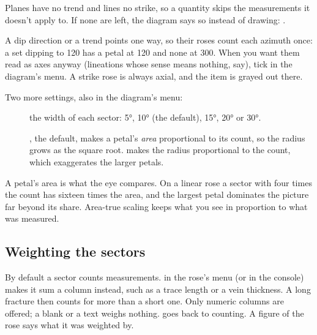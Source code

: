 
Planes have no trend and lines no strike, so a quantity skips the measurements it doesn't apply to. If
none are left, the diagram says so instead of drawing: .

A dip direction or a trend points one way, so their roses count each azimuth once: a set dipping to 120
has a petal at 120 and none at 300. When you want them read as axes anyway (lineations whose sense means
nothing, say), tick  in the diagram's menu. A strike rose is always axial,
and the item is grayed out there.

Two more settings, also in the diagram's menu:

\begin{description}
\item[] the width of each sector: 5°, 10° (the default), 15°, 20° or 30°.
\item[] , the default, makes a petal's \emph{area} proportional to its count,
so the radius grows as the square root.  makes the radius proportional to the count, which
exaggerates the larger petals.
\end{description}

\begin{why}
A petal's area is what the eye compares. On a linear rose a sector with four times the count has sixteen
times the area, and the largest petal dominates the picture far beyond its share. Area-true scaling keeps
what you see in proportion to what was measured.
\end{why}

\subsection{Weighting the sectors}\label{sec:rose-weight}

By default a sector counts measurements.  in the rose's menu (or  in the
console) makes it sum a column instead, such as a trace length or a vein thickness. A long fracture then
counts for more than a short one. Only numeric columns are offered; a blank or a text weighs nothing.
 goes back to counting. A figure of the rose says what it was weighted by.

